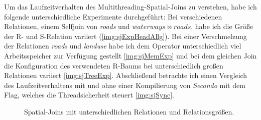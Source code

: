 \documentclass[a4paper,12pt,twoside]{article}
\newcommand{\Fb}[1]{\textit{#1}} %
\begin{document}
Um das Laufzeitverhalten des Multithreading-Spatial-Joins zu verstehen, habe ich folgende unterschiedliche Experimente durchgeführt: Bei verschiedenen Relationen, einem Selfjoin von \Fb{roads} und $waterways \bowtie roads$, habe ich die Größe der R- und S-Relation variiert (\autoref{img:sjExpHeadAllg}). Bei einer Verschmelzung der Relationen \Fb{roads} und \Fb{landuse} habe ich dem Operator unterschiedlich viel Arbeitsspeicher zur Verfügung gestellt \autoref{img:sjMemExp} und bei dem gleichen Join die Konfiguration des verwendeten R-Baums bei unterschiedlich großen Relationen variiert \autoref{img:sjTreeExp}. Abschließend betrachte ich einen Vergleich des Laufzeitverhaltens mit und ohne einer Kompilierung von \Fb{Secondo} mit dem Flag, welches die Threadsicherheit steuert {\autoref{img:sjSync}}. 

\begin{figure}[H]
	\centering
	\qquad	
	\caption{Spatial-Joins mit unterschiedlichen Relationen und Relationsgrößen.}
	\label{img:sjExpHeadAllg}
\end{figure}
\end{document}
